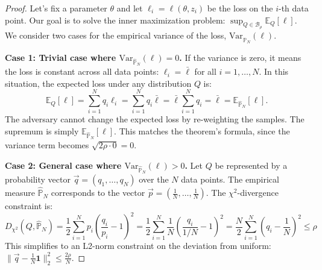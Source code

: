 \documentclass[12pt]{report}
\begin{document}
\begin{proof}
Let's fix a parameter $\theta$ and let $\ell_i = \ell(\theta, z_i)$ be the loss on the $i$-th data point. Our goal is to solve the inner maximization problem: 
$\sup_{Q \in \mathcal{B}_\rho} \mathbb{E}_Q[\ell]$. We consider two cases for the empirical variance of the loss, $\text{Var}_{\hat{\mathbb{P}}_N}(\ell)$.

\textbf{Case 1: Trivial case where $\text{Var}_{\hat{\mathbb{P}}_N}(\ell) = 0$.}
If the variance is zero, it means the loss is constant across all data points: $\ell_i = \bar{\ell}$ for all $i=1, \dots, N$. 
In this situation, the expected loss under any distribution $Q$ is:
\[
\mathbb{E}_Q[\ell] = \sum_{i=1}^N q_i \ell_i = \sum_{i=1}^N q_i \bar{\ell} = \bar{\ell} \sum_{i=1}^N q_i = \bar{\ell} = \mathbb{E}_{\hat{\mathbb{P}}_N}[\ell].
\]
The adversary cannot change the expected loss by re-weighting the samples. The supremum is simply $\mathbb{E}_{\hat{\mathbb{P}}_N}[\ell]$. 
This matches the theorem's formula, since the variance term becomes $\sqrt{2\rho \cdot 0} = 0$.

\textbf{Case 2: General case where $\text{Var}_{\hat{\mathbb{P}}_N}(\ell) > 0$.}
Let $Q$ be represented by a probability vector $\vec{q} = (q_1, \dots, q_N)$ over the $N$ data points. 
The empirical measure $\hat{\mathbb{P}}_N$ corresponds to the vector $\vec{p} = (\frac{1}{N}, \dots, \frac{1}{N})$. The $\chi^2$-divergence constraint is:
\[
D_{\chi^2}(Q, \hat{\mathbb{P}}_N) = \frac{1}{2} \sum_{i=1}^N p_i \left(\frac{q_i}{p_i} - 1\right)^2 = \frac{1}{2} \sum_{i=1}^N \frac{1}{N} \left(\frac{q_i}{1/N} - 1\right)^2 = \frac{N}{2} \sum_{i=1}^N \left(q_i - \frac{1}{N}\right)^2 \le \rho
\]
This simplifies to an L2-norm constraint on the deviation from uniform: $\|\vec{q} - \frac{1}{N}\mathbf{1}\|_2^2 \le \frac{2\rho}{N}$.


\end{proof}
\end{document}
